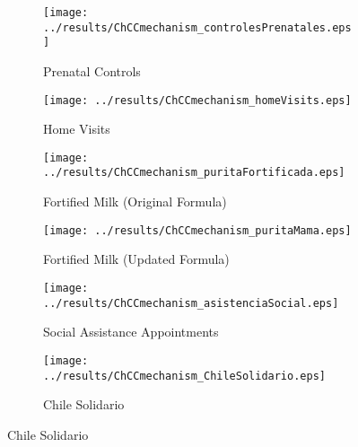 \documentclass[12pt]{article}
\begin{document}
\begin{spacing}{1.4}
\begin{figure}[htpb!]
  \begin{center}
    \caption{ChCC rollout and Pregnancy Inputs Dispursed}
    \label{mech-plots}
    \begin{subfigure}{.5\textwidth}
      \centering
      \texttt{[image: ../results/ChCCmechanism\_controlesPrenatales.eps]}
      \caption{Prenatal Controls}
      \label{mech-prenatal}
    \end{subfigure}%
    \begin{subfigure}{.5\textwidth}
      \centering
      \texttt{[image: ../results/ChCCmechanism\_homeVisits.eps]}
      \caption{Home Visits}
      \label{mech-visits}
    \end{subfigure}
    \begin{subfigure}{.5\textwidth}
      \centering
      \texttt{[image: ../results/ChCCmechanism\_puritaFortificada.eps]}
      \caption{Fortified Milk (Original Formula)}
      \label{mech-purita}
    \end{subfigure}%
    \begin{subfigure}{.5\textwidth}
      \centering
      \texttt{[image: ../results/ChCCmechanism\_puritaMama.eps]}
      \caption{Fortified Milk (Updated Formula)}
      \label{mech-mama}
    \end{subfigure}
    \begin{subfigure}{.5\textwidth}
      \centering
      \texttt{[image: ../results/ChCCmechanism\_asistenciaSocial.eps]}
      \caption{Social Assistance Appointments}
      \label{mech-social}
    \end{subfigure}%
    \begin{subfigure}{.5\textwidth}
      \centering
      \texttt{[image: ../results/ChCCmechanism\_ChileSolidario.eps]}
      \caption{Chile Solidario}
      \label{mech-CS}
    \end{subfigure}
  \end{center}
\end{figure}


\end{spacing}
\end{document}
